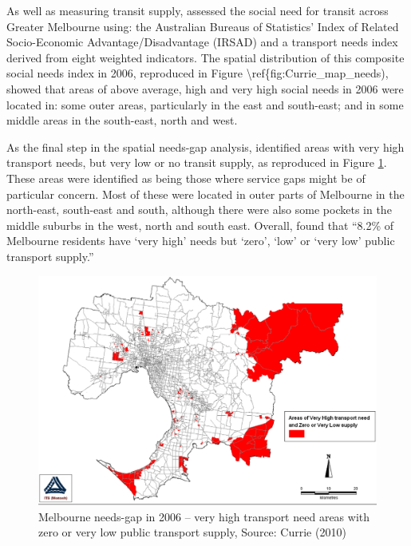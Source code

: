 \documentclass[preprint, 3p,
authoryear]{elsarticle} %
\begin{document}
As well as measuring transit supply, \citet{currie2010identifying}
assessed the social need for transit across Greater Melbourne using: the
Australian Bureaus of Statistics' Index of Related Socio-Economic
Advantage/Disadvantage (IRSAD) and a transport needs index derived from
eight weighted indicators. The spatial distribution of this composite
social needs index in 2006, reproduced in Figure
\textbackslash ref\{fig:Currie\_map\_needs), showed that areas of above
average, high and very high social needs in 2006 were located in: some
outer areas, particularly in the east and south-east; and in some middle
areas in the south-east, north and west.

As the final step in the spatial needs-gap analysis,
\citet{currie2010identifying} identified areas with very high transport
needs, but very low or no transit supply, as reproduced in Figure
\ref{fig:Currie_map_gap}. These areas were identified as being those
where service gaps might be of particular concern. Most of these were
located in outer parts of Melbourne in the north-east, south-east and
south, although there were also some pockets in the middle suburbs in
the west, north and south east. Overall, \citet{currie2010identifying}
found that ``8.2\% of Melbourne residents have `very high' needs but
`zero', `low' or `very low' public transport supply.''

\begin{figure}
\includegraphics[width=1\linewidth]{graphics/Currie2010gap} \caption{Melbourne needs-gap in 2006 – very high transport need areas with zero or very low public transport supply, Source: Currie (2010)}\label{fig:Currie_map_gap}
\end{figure}
\end{document}
